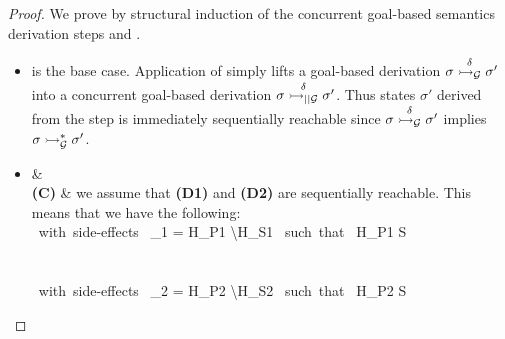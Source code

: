 \documentclass{tlp}
\begin{document}
\begin{proof}
We prove by structural induction of the concurrent goal-based semantics derivation steps 
 and .
  \begin{itemize}
	  \item {} is the base case. Application of  simply lifts a
	        goal-based derivation $\sigma \stackrel{\delta}{\rightarrowtail_{\cal G}} \sigma'$ into a concurrent
	        goal-based derivation $\sigma \stackrel{\delta}{\rightarrowtail_{\mid\mid\cal G}} \sigma'$. Thus states 
	        $\sigma'$ derived from the  step is immediately sequentially
	        reachable since $\sigma \stackrel{\delta}{\rightarrowtail_{\cal G}} \sigma'$ implies
	        $\sigma \rightarrowtail^*_{\cal G} \sigma'$.
	  \item {}
	        {\small 
              {
                 &  \\
               \mbox{\bf (C)} \sgap \partranssf{\delta} 
                 & 
               \ea} 
	        \eda }
	        we assume that {\bf (D1)} and {\bf (D2)} are sequentially reachable. This means that 
	        we have the following:
	           \goaltransstar {} \\
	          \mbox{ with side-effects } \delta_1 = H_{P1} \backslash H_{S1} \mbox{ such that } H_{P1} \subseteq S   \\ \\
	           \goaltransstar {} \\
	          \mbox{ with side-effects } \delta_2 = H_{P2} \backslash H_{S2} \mbox{ such that } H_{P2} \subseteq S 

\end{itemize}
\end{proof}
\end{document}
